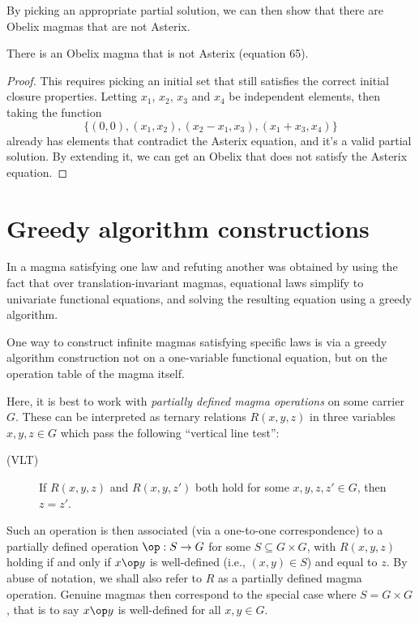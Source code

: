 By picking an appropriate partial solution, we can then show that there are Obelix magmas that are not Asterix.
\begin{corollary}
There is an Obelix magma that is not Asterix (equation 65).
\end{corollary}
\begin{proof}
This requires picking an initial set that still satisfies the correct initial closure properties. Letting
$x_1$, $x_2$, $x_3$ and $x_4$ be independent elements, then taking the function
$$\{(0,0), (x_1,x_2), (x_2-x_1, x_3), (x_1+x_3, x_4)\}$$
already has elements that contradict the Asterix equation, and it's a valid partial solution. By extending
it, we can get an Obelix that does not satisfy the Asterix equation.
\end{proof}

\section{Greedy algorithm constructions}\label{greedy-section}

In  a magma satisfying one law and refuting another was obtained by using the
fact that over translation-invariant magmas, equational laws simplify to univariate functional equations,
and solving the resulting equation using a greedy algorithm.

One way to construct infinite magmas satisfying specific laws is via a greedy algorithm construction not on a
one-variable functional equation, but on the operation table of the magma itself.

Here, it is best to work with \emph{partially defined magma operations} on some carrier $G$.  These can be interpreted as ternary relations $R(x,y,z)$ in three variables $x,y,z \in G$ which pass the following ``vertical line test'':

\begin{description}
  \item[(VLT)] If $R(x,y,z)$ and $R(x,y,z')$ both hold for some $x,y,z,z' \in G$, then $z=z'$.
\end{description}

Such an operation is then associated (via a one-to-one correspondence) to a partially defined operation $\op : S \to G$ for some $S \subseteq G \times G$, with $R(x,y,z)$ holding if and only if $x \op y$ is well-defined (i.e., $(x,y) \in S$) and equal to $z$.  By abuse of notation, we shall also refer to $R$ as a partially defined magma operation.  Genuine magmas then correspond to the special case where $S = G \times G$, that is to say $x \op y$ is well-defined for all $x,y \in G$.

